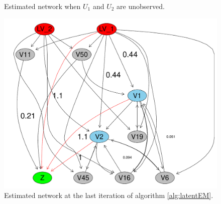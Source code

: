 \documentclass{article}
\begin{document}
\begin{figure}[ht!]
\begin{minipage}[t]{0.33\linewidth}
     \caption{\label{fig_missing} Estimated network when $U_1$ and
      $U_2$ are unobserved.}
   \end{minipage}\hfill
   \begin{minipage}[t]{0.33\linewidth }
    \includegraphics[width=\linewidth]{./images/estimated_network_infered.pdf}
    \caption{\label{fig_estnet_infered} Estimated network at the last
      iteration of algorithm \ref{alg:latentEM}.}
  \end{minipage}
\end{figure}
\end{document}
